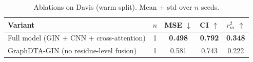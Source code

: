 \begin{table}[t]
\centering
\caption{Ablations on Davis (warm split). Mean $\pm$ std over $n$ seeds.}
\label{tab:ablation}
\small
\begin{tabular}{lcccc}
\toprule
Variant & $n$ & MSE $\downarrow$ & CI $\uparrow$ & $r_m^2$ $\uparrow$ \\
\midrule
Full model (GIN + CNN + cross-attention) & 1 & \textbf{0.498} & \textbf{0.792} & \textbf{0.348} \\
GraphDTA-GIN (no residue-level fusion) & 1 & 0.581 & 0.743 & 0.222 \\
\bottomrule
\end{tabular}
\end{table}